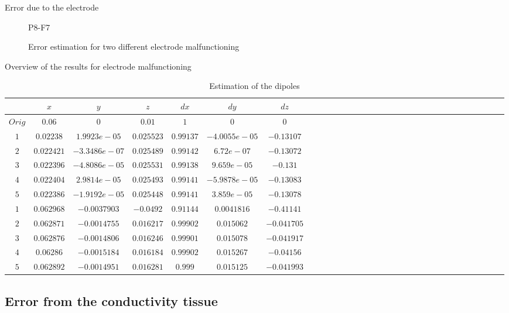 \documentclass[t,12pt,english
\ifx\beamermode\undefined\else,\beamermode\fi
]{beamer}
\begin{document}
\begin{frame}{Error due to the electrode}
\begin{figure}[!htbp]
\tiny{P8-F7}\label{34}
\endminipage\hfill
\caption{\small \tiny Error estimation for two different electrode malfunctioning}
\end{figure}


\end{frame}

\begin{frame}{Overview of the results for electrode malfunctioning}

 \begin{table}[!htbp]
 \tiny 
\centering
\caption{\small Estimation of the dipoles}
\label{table:5}
\begin{tabular}{c c c c c c c c c c c c c c c c c c c c c c c c c c c c c c c } 
\hline 
$ $&$x$&$y$&$z$&$dx$&$dy$&$dz$\\
\hline 
$Orig$&$0.06$&$0$&$0.01$&$1$&$0$&$0$\\
\hline 
$1$&$0.02238$&$1.9923e-05$&$0.025523$&$0.99137$&$-4.0055e-05$&$-0.13107$\\
$2$&$0.022421$&$-3.3486e-07$&$0.025489$&$0.99142$&$6.72e-07$&$-0.13072$\\
$3$&$0.022396$&$ -4.8086e-05$&$0.025531$&$0.99138$&$9.659e-05$&$-0.131$\\
$4$&$0.022404$&$2.9814e-05$&$0.025493$&$0.99141$&$-5.9878e-05$&$-0.13083$\\
$5$&$0.022386$&$-1.9192e-05$&$0.025448$&$0.99141$&$3.859e-05$&$ -0.13078$\\
$1$&$0.062968$&$-0.0037903$&$ -0.0492$&$0.91144$&$0.0041816$&$-0.41141$\\
$2$&$0.062871$&$-0.0014755$&$ 0.016217$&$0.99902$&$0.015062$&$-0.041705$\\
$3$&$0.062876$&$-0.0014806$&$ 0.016246$&$0.99901$&$0.015078$&$-0.041917$\\
$4$&$0.06286$&$-0.0015184$&$0.016184$&$0.99902$&$0.015267$&$-0.04156$\\
$5$&$0.062892$&$-0.0014951$&$ 0.016281$&$0.999$&$0.015125$&$-0.041993$\\
\hline 

\end{tabular}
\end{table}

    
\end{frame}


\subsection{Error from the  conductivity tissue}
\end{document}
